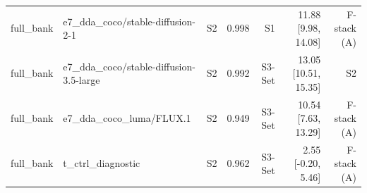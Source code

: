 \begin{table}[htbp]
\begin{tabular}{llrrrrr}
full\_bank & e7\_dda\_coco/stable-diffusion-2-1 & S2 & 0.998 & S1 & 11.88 [9.98, 14.08] & F-stack (A) \\
full\_bank & e7\_dda\_coco/stable-diffusion-3.5-large & S2 & 0.992 & S3-Set & 13.05 [10.51, 15.35] & S2 \\
full\_bank & e7\_dda\_coco\_luma/FLUX.1 & S2 & 0.949 & S3-Set & 10.54 [7.63, 13.29] & F-stack (A) \\
full\_bank & t\_ctrl\_diagnostic & S2 & 0.962 & S3-Set & 2.55 [-0.20, 5.46] & F-stack (A) \\
\bottomrule
\end{tabular}
\end{table}
